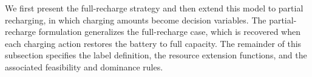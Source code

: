 \documentclass[3p,11pt,authoryear]{elsarticle}  %
\begin{document}
We first present the full-recharge strategy and then extend this model to partial recharging, in which charging amounts become decision variables. The partial-recharge formulation generalizes the full-recharge case, which is recovered when each charging action restores the battery to full capacity. The remainder of this subsection specifies the label definition, the resource extension functions, and the associated feasibility and dominance rules.




\end{document}
